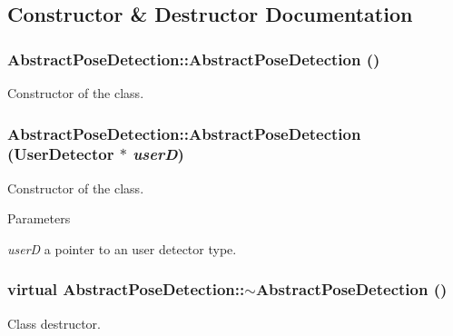 \subsection{Constructor \& Destructor Documentation}
\hypertarget{classAbstractPoseDetection_ab75546d06563322c8c8f3ffc04375d02}{
\subsubsection[{AbstractPoseDetection}]{\setlength{\rightskip}{0pt plus 5cm}AbstractPoseDetection::AbstractPoseDetection ()}}
\label{classAbstractPoseDetection_ab75546d06563322c8c8f3ffc04375d02}
Constructor of the class. \hypertarget{classAbstractPoseDetection_a255ffffe8620b1c83b168f97bbd57fdd}{
\subsubsection[{AbstractPoseDetection}]{\setlength{\rightskip}{0pt plus 5cm}AbstractPoseDetection::AbstractPoseDetection ({\bf UserDetector} $\ast$ {\em userD})}}
\label{classAbstractPoseDetection_a255ffffe8620b1c83b168f97bbd57fdd}
Constructor of the class. 
\begin{DoxyParams}{Parameters}
\item[{\em userD}]a pointer to an user detector type. \end{DoxyParams}
\hypertarget{classAbstractPoseDetection_a017e98779fcc1340c69ef52911966ac3}{
\subsubsection[{$\sim$AbstractPoseDetection}]{\setlength{\rightskip}{0pt plus 5cm}virtual AbstractPoseDetection::$\sim$AbstractPoseDetection ()}}
\label{classAbstractPoseDetection_a017e98779fcc1340c69ef52911966ac3}
Class destructor. 

